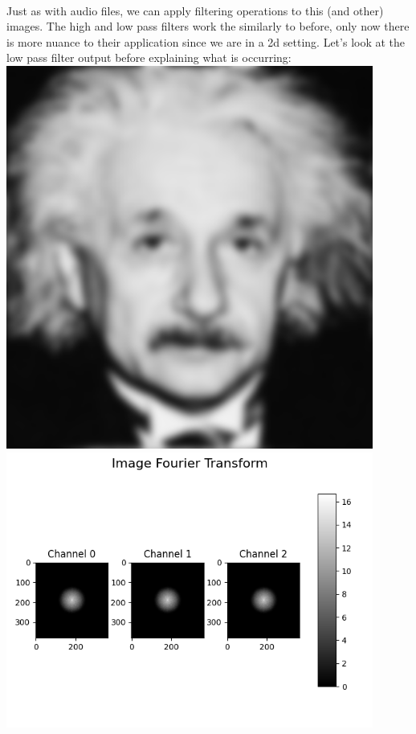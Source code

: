 \documentclass[notitlepage]{article}
\begin{document}
\\
Just as with audio files, we can apply filtering operations to this (and other) images.
The high and low pass filters work the similarly to before, only now there is more nuance to
their application since we are in a 2d setting. Let's look at the low pass filter output
before explaining what is occurring:
\\
\includegraphics[width=4.75in]{../samples/images/einstein_low15.png}
\\
\includegraphics[width=4.75in]{../samples/images/einstein_low15_fourier_transform.png}
\\
\end{document}
